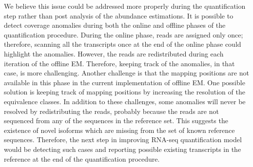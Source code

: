 We believe this issue could be addressed more properly during the quantification step rather than post
analysis of the abundance estimations.
It is possible to detect coverage anomalies during both the online
and offline phases of the quantification procedure. During the online phase, reads are assigned only once; therefore, scanning all the transcripts once at the end of the online phase could highlight the anomalies. However,
the reads are redistributed during each iteration of the offline EM. Therefore, keeping track of the anomalies, in that case, is more challenging. Another challenge is that the mapping positions are not available in this phase in the current implementation of offline EM. One possible solution is keeping track of mapping positions by increasing the resolution of the equivalence classes. In addition to these challenges, some anomalies will never be resolved by redistributing the reads, probably because the reads are not sequenced from any of
the sequences in the reference set. This suggests the existence of novel isoforms which are missing from the set of known reference sequences. Therefore, the next step in improving RNA-seq quantification model would be detecting such cases and
reporting possible existing transcripts in the reference at the end of the quantification procedure.